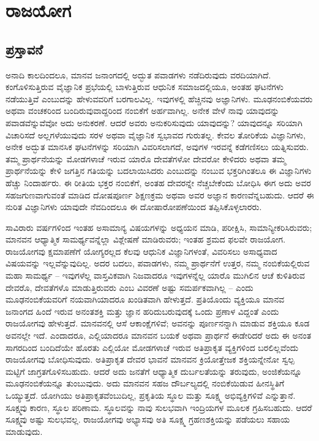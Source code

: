 

\part{ರಾಜಯೋಗ}

\chapter{ಪ್ರಸ್ತಾವನೆ}

ಅನಾದಿ ಕಾಲದಿಂದಲೂ, ಮಾನವ ಜನಾಂಗದಲ್ಲಿ ಅದ್ಭುತ ಪವಾಡಗಳು ನಡೆದಿರುವುದು ವರದಿಯಾಗಿದೆ. ಕಂಗೊಳಿಸುತ್ತಿರುವ ವೈಜ್ಞಾನಿಕ ಪ್ರಭೆಯಲ್ಲಿ ಬಾಳುತ್ತಿರುವ ಆಧುನಿಕ ಸಮಾಜದಲ್ಲಿಯೂ, ಅಂತಹ ಘಟನೆಗಳು ನಡೆಯುತ್ತಿವೆ ಎಂಬುದನ್ನು ಹೇಳುವವರಿಗೆ ಬರಗಾಲವಿಲ್ಲ. ಇವುಗಳಲ್ಲಿ ಹೆಚ್ಚಿನವು ಅಜ್ಞಾನಿಗಳು. ಮೂಢನಂಬಿಕೆಯವರು ಅಥವಾ ವಂಚಕರಿಂದ ಬಂದಿರುವುವಾದ್ದರಿಂದ ನಂಬಿಕೆಗೆ ಅರ್ಹವಾಗಿಲ್ಲ. ಅನೇಕ ವೇಳೆ ನಾವು ಯಾವುದನ್ನು ಪವಾಡವೆನ್ನುವೆವೋ ಅದು ಅನುಕರಣೆ. ಆದರೆ ಅವರು ಅನುಕರಿಸುವುದು ಯಾವುದನ್ನು? ಯಾವುದನ್ನೂ ಸರಿಯಾಗಿ ವಿಚಾರಿಸದೆ ಅಲ್ಲಗಳೆಯುವುದು ಸರಳ ಅಥವಾ ವೈಜ್ಞಾನಿಕ ಸ್ವಭಾವದ ಗುರುತಲ್ಲ. ಕೇವಲ ತೋರಿಕೆಯ ವಿಜ್ಞಾನಿಗಳು, ಅನೇಕ ಅದ್ಭುತ ಮಾನಸಿಕ ಘಟನೆಗಳನ್ನು ಸರಿಯಾಗಿ ವಿವರಿಸಲಾಗದೆ, ಅವುಗಳ ಇರವನ್ನೆ ಕಡೆಗಣಿಸಲು ಯತ್ನಿಸುವರು. ತಮ್ಮ ಪ್ರಾರ್ಥನೆಯನ್ನು ಮೋಡಗಳಾಚೆ ಇರುವ ಯಾರೊ ದೇವತೆಗಳೋ ದೇವರೋ ಕೇಳಿದರು ಅಥವಾ ತಮ್ಮ ಪ್ರಾರ್ಥನೆಯನ್ನು ಕೇಳಿ ಜಗತ್ತಿನ ಗತಿಯನ್ನು ಬದಲಾಯಿಸಿದರು ಎಂಬುದನ್ನು ನಂಬುವ ಭಕ್ತರಿಗಿಂತಲೂ ಈ ವಿಜ್ಞಾನಿಗಳು ಹೆಚ್ಚು ನಿಂದಾರ್ಹರು. ಈ ರೀತಿಯ ಭಕ್ತರ ನಂಬಿಕೆಗೆ, ಅಂತಹ ದೇವರನ್ನೇ ನೆಚ್ಚಬೇಕೆಂದು ಬೋಧಿಸಿ ಈಗ ಅದು ಅವರ ಸಹಜಗುಣವಾಗುವಂತೆ ಮಾಡಿದ ದೋಷಪೂರ್ಣ ಶಿಕ್ಷಣಕ್ರಮ ಅಥವಾ ಅವರ ಅಜ್ಞಾನ ಕಾರಣವೆನ್ನಬಹುದು. ಆದರೆ ಈ ನುರಿತ ವಿಜ್ಞಾನಿಗಳು ಯಾವುದೇ ನೆವದಿಂದಲೂ ಈ ದೋಷಾರೋಪಣೆಯಿಂದ ತಪ್ಪಿಸಿಕೊಳ್ಳಲಾರರು. 

\vskip 5pt

ಸಾವಿರಾರು ವರ್ಷಗಳಿಂದ ಇಂತಹ ಅಸಾಮಾನ್ಯ ವಿಷಯಗಳನ್ನು ಅಧ್ಯಯನ ಮಾಡಿ, ಪರೀಕ್ಷಿಸಿ, ಸಾಮಾನ್ಯೀಕರಿಸಿರುವರು; ಮಾನವನ ಆಧ್ಯಾತ್ಮಿಕ ಸಾಮರ್ಥ್ಯವನ್ನೆಲ್ಲಾ ವಿಶ್ಲೇಷಣೆ ಮಾಡಿರುವರು; ಇಂತಹ ಶ್ರಮದ ಫಲವೇ ರಾಜಯೋಗ. ರಾಜಯೋಗವು ಕ್ಷಮಾಪಣೆಗೆ ಯೋಗ್ಯರಲ್ಲದ ಕೆಲವು ಆಧುನಿಕ ವಿಜ್ಞಾನಿಗಳಂತೆ, ವಿವರಿಸಲು ಅಸಾಧ್ಯವಾದ ವಿಷಯವನ್ನು ಇಲ್ಲವೆನ್ನುವುದಿಲ್ಲ. ಅದರ ಬದಲು, ಪವಾಡಗಳು, ನಮ್ಮ ಪ್ರಾರ್ಥನೆಗೆ ಉತ್ತರ, ನಮ್ಮ ನಂಬಿಕೆಯಲ್ಲಿರುವ ಮಹಾ ಸಾಮರ್ಥ್ಯ – ಇವುಗಳೆಲ್ಲ ವಾಸ್ತವಿಕವಾಗಿ ನಿಜವಾದರೂ ಇವುಗಳನ್ನೆಲ್ಲ ಯಾರೊ ಮುಗಿಲಿನ ಆಚೆ ಕುಳಿತಿರುವ ದೇವರೊ, ದೇವತೆಗಳೊ ಮಾಡುತ್ತಿರುವರು ಎಂಬ ವಿವರಣೆ ಅಷ್ಟು ಸಮರ್ಪಕವಾಗಿಲ್ಲ – ಎಂದು ಮೂಢನಂಬಿಕೆಯವರಿಗೆ ನಯವಾಗಿಯಾದರೂ ಖಂಡಿತವಾಗಿ ಹೇಳುತ್ತದೆ. ಪ್ರತಿಯೊಂದು ವ್ಯಕ್ತಿಯೂ ಮಾನವ ಜನಾಂಗದ ಹಿಂದೆ ಇರುವ ಅನಂತಶಕ್ತಿ ಮತ್ತು ಜ್ಞಾನ ಹರಿದುಬರುವುದಕ್ಕೆ ಒಂದು ಪ್ರಣಾಳ ವಿದ್ದಂತೆ ಎಂದು ರಾಜಯೋಗವು ಹೇಳುತ್ತದೆ. ಮಾನವನಲ್ಲಿ ಆಸೆ ಆಕಾಂಕ್ಷೆಗಳಿವೆ; ಅವನನ್ನು ಪೂರ್ಣನನ್ನಾಗಿ ಮಾಡುವ ಶಕ್ತಿಯೂ ಕೂಡ ಅವನಲ್ಲೇ ಇದೆ. ಎಂದಾದರೂ, ಎಲ್ಲಿಯಾದರೂ ಮಾನವನ ಬಯಕೆ ಅಥವಾ ಪ್ರಾರ್ಥನೆ ಈಡೇರಿದರೆ ಅದು ಈ ಅನಂತ ಸಾಗರದಿಂದ ಬಂದಿದೆಯೇ ಹೊರತು ಎಲ್ಲಿಯೋ ಮೋಡಗಳಾಚೆ ಇರುವ ಅತಿಪ್ರಾಕೃತ ವ್ಯಕ್ತಿಗಳಿಂದ ಬರಲಿಲ್ಲವೆಂದು ರಾಜಯೋಗವು ಬೋಧಿಸುವುದು. ಅತಿಪ್ರಾಕೃತ ದೇವರ ಭಾವನೆ ಮಾನವನ ಕ್ರಿಯೋತ್ತೇಜಕ ಶಕ್ತಿಯನ್ನೇನೋ ಸ್ವಲ್ಪ ಮಟ್ಟಿಗೆ ಜಾಗ್ರತಗೊಳಿಸಬಹುದು. ಆದರೆ ಅದು ಜನತೆಗೆ ಆಧ್ಯಾತ್ಮಿಕ ದುರ್ಬಲತೆಯನ್ನು ತರುವುದು, ಅಂಜಿಕೆಯನ್ನೂ ಮೂಢನಂಬಿಕೆಯನ್ನೂ ತುಂಬುವುದು. ಅದು ಮಾನವನ ಸಹಜ ದೌರ್ಬಲ್ಯದಲ್ಲಿ ನಂಬಿಕೆಯಿಡುವ ಹೀನಸ್ಥಿತಿಗೆ ಒಯ್ಯುತ್ತದೆ. ಯೋಗಿಯು ಅತಿಪ್ರಾಕೃತವೆಂಬುದಿಲ್ಲ, ಪ್ರಕೃತಿಯ ಸ್ಥೂಲ ಮತ್ತು ಸೂಕ್ಷ್ಮ ಅಭಿವ್ಯಕ್ತಿಗಳಿವೆ ಎನ್ನುತ್ತಾನೆ. ಸೂಕ್ಷ್ಮವು ಕಾರಣ, ಸ್ಥೂಲ ಪರಿಣಾಮ. ಸ್ಥೂಲವನ್ನು ನಾವು ಸುಲಭವಾಗಿ ಇಂದ್ರಿಯಗಳ ಮೂಲಕ ಗ್ರಹಿಸಬಹುದು. ಆದರೆ ಸೂಕ್ಷ್ಮವು ಅಷ್ಟು ಸುಲಭವಲ್ಲ. ರಾಜಯೋಗವು ಅಭ್ಯಾಸವು ಅತಿ ಸೂಕ್ಷ್ಮ ಗ್ರಹಣಶಕ್ತಿಯನ್ನು ಪಡೆಯಲು ಸಹಾಯ ಮಾಡುವುದು. 

